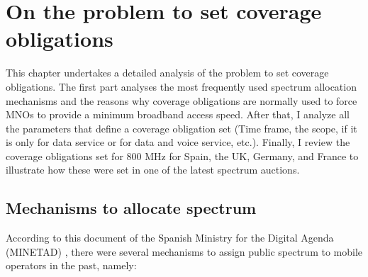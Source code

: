 \chapter{On the problem to set coverage obligations}
This chapter undertakes a detailed analysis of the problem to set coverage obligations. The first part analyses the most frequently used spectrum allocation mechanisms and the reasons why coverage obligations are normally used to force MNOs to provide a minimum broadband access speed. After that, I analyze all the parameters that define a coverage obligation set (Time frame, the scope, if it is only for data service or for data and voice service, etc.). Finally, I review the coverage obligations set for 800 MHz for Spain, the UK, Germany, and France to illustrate how these were set in one of the latest spectrum auctions.\par

\section{Mechanisms to allocate spectrum}
According to this document of the Spanish Ministry for the Digital Agenda (MINETAD) \cite{2-01}, there were several mechanisms to assign public spectrum to mobile operators in the past, namely:\par

